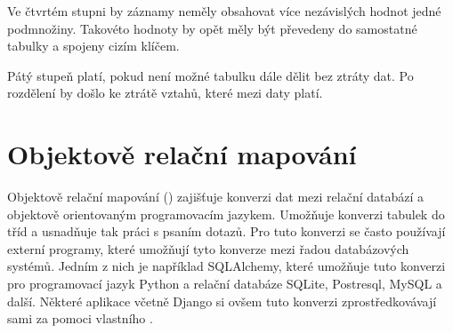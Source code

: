 Ve čtvrtém stupni by záznamy neměly obsahovat více nezávislých hodnot jedné podmnožiny. 
Takovéto hodnoty by opět měly být převedeny do samostatné tabulky a spojeny cizím klíčem.

Pátý stupeň platí, pokud není možné tabulku dále dělit bez ztráty dat. Po 
rozdělení by došlo ke ztrátě vztahů, které mezi daty platí. \cite{normalizace}



\section{Objektově relační mapování}

Objektově relační mapování () zajišťuje konverzi dat mezi relační
databází a objektově orientovaným programovacím jazykem. Umožňuje
konverzi  tabulek do tříd a usnadňuje tak práci s psaním 
dotazů. Pro tuto konverzi se často používají externí programy, které
umožňují tyto konverze mezi řadou databázových systémů. Jedním z nich
je například SQLAlchemy, které umožňuje tuto konverzi pro programovací
jazyk Python a relační databáze SQLite, Postresql, MySQL a
další. Některé aplikace včetně Django si ovšem tuto konverzi
zprostředkovávají sami za pomoci vlastního . \cite{orm}
\cite{sqlalchemy}



















